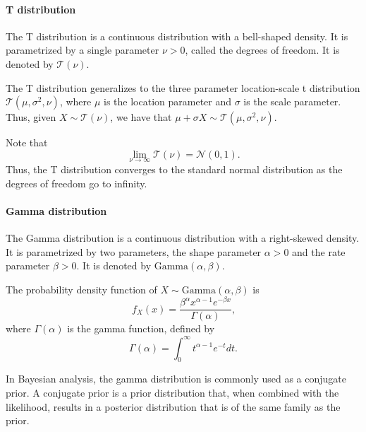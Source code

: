 \paragraph{T distribution} The T distribution is a continuous distribution with a
bell-shaped density.  It is parametrized by a single parameter $\nu > 0$, called the
degrees of freedom.  It is denoted by $\mathcal{T}(\nu)$.


The T distribution generalizes to the three parameter location-scale t distribution
$\mathcal{T}(\mu, \sigma^2, \nu)$, where $\mu$ is the location parameter and $\sigma$ is
the scale parameter.  Thus, given $X \sim \mathcal{T}(\nu)$, we have that
$\mu + \sigma X \sim \mathcal{T}(\mu, \sigma^2, \nu)$.

Note that $$\lim_{\nu \rightarrow \infty} \mathcal{T}(\nu) = \mathcal{N}(0, 1)\text{.}$$
Thus, the T distribution converges to the standard normal distribution as the degrees of
freedom go to infinity.

\paragraph{Gamma distribution} The Gamma distribution is a continuous distribution with a
right-skewed density.  It is parametrized by two parameters, the shape parameter $\alpha
> 0$ and the rate parameter $\beta > 0$.  It is denoted by $\text{Gamma}(\alpha, \beta)$.

The probability density function of $X \sim \text{Gamma}(\alpha, \beta)$ is
\begin{equation}
  \label{eq:gamma}
  f_X(x) = \frac{\beta^\alpha x^{\alpha - 1} e^{-\beta x}}{\Gamma(\alpha)}\text{,}
\end{equation}
where $\Gamma(\alpha)$ is the gamma function, defined by
\begin{equation}
  \label{eq:gammaf}
  \Gamma(\alpha) = \int_0^\infty t^{\alpha - 1} e^{-t} dt\text{.}
\end{equation}

In Bayesian analysis, the gamma distribution is commonly used as a conjugate prior.
A conjugate prior is a prior distribution that, when combined with the likelihood,
results in a posterior distribution that is of the same family as the prior.

